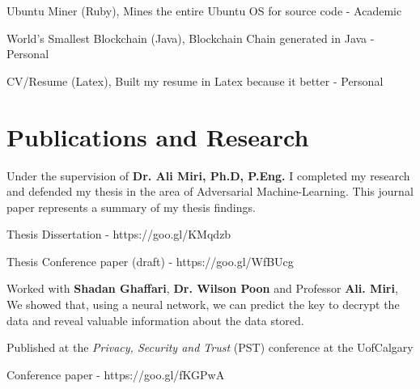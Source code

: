 \documentclass[]{deedy-resume-openfont}
\begin{document}
\begin{minipage}[t]{0.66\textwidth}
\begin{tightemize}
\item Ubuntu Miner (Ruby), Mines the entire Ubuntu OS for source code - Academic
\item World's Smallest Blockchain (Java), Blockchain Chain generated in Java - Personal
\item CV/Resume (Latex), Built my resume in Latex because it better - Personal
\end{tightemize}
\sectionsep



\section{Publications and Research}
\begin{tightemize}
\item Under the supervision of \textbf{Dr. Ali Miri, Ph.D, P.Eng.} I completed my research and defended my thesis in the area of Adversarial Machine-Learning. This journal paper represents a summary of my thesis findings. 
\item Thesis Dissertation - https://goo.gl/KMqdzb
\item Thesis Conference paper (draft) - https://goo.gl/WfBUcg
\end{tightemize}
\sectionsep

\begin{tightemize}
\item Worked with \textbf{Shadan Ghaffari}, \textbf{Dr. Wilson Poon} and Professor \textbf{Ali. Miri}, We showed that, using a neural network, we can predict the key to decrypt the data and reveal valuable information about the data stored.
\item Published at the \textit{Privacy, Security and Trust} (PST) conference at the UofCalgary
\item Conference paper - https://goo.gl/fKGPwA
\end{tightemize}
\sectionsep

\end{minipage} 
\end{document}
